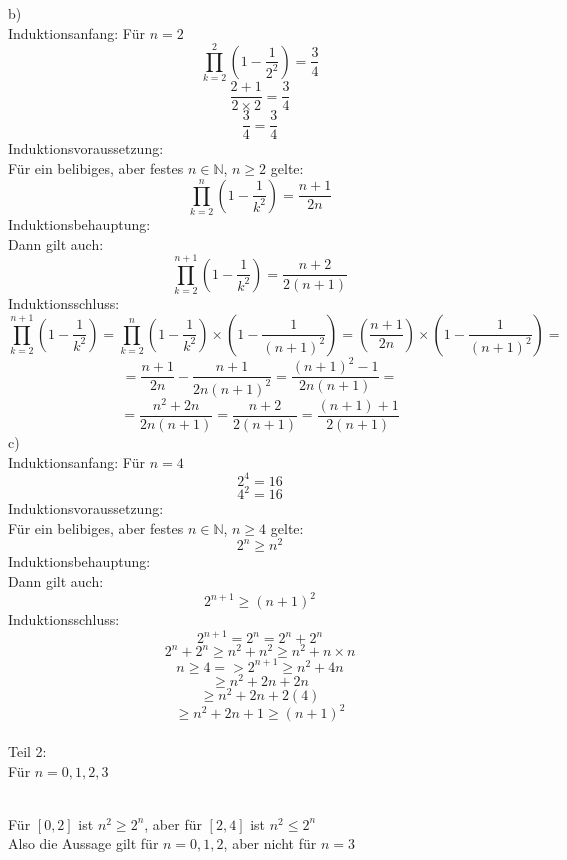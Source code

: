 \documentclass[11pt]{article}
\begin{document}
			\indent b)\\
				Induktionsanfang: Für $n=2$
					$$\prod\limits_{k=2}^2(1-\frac{1}{2^2})=\frac{3}{4}$$
					$$\frac{2+1}{2\times2}=\frac{3}{4}$$
					$$\frac{3}{4}=\frac{3}{4}$$
				Induktionsvoraussetzung:\\
				Für ein belibiges, aber festes $n \in \mathbb{N}$, $n \geq 2$ gelte:
					$$\prod\limits_{k=2}^n(1-\frac{1}{k^2})=\frac{n+1}{2n}$$
				Induktionsbehauptung:\\
				Dann gilt auch:
					$$\prod\limits_{k=2}^{n+1}(1-\frac{1}{k^2})=\frac{n+2}{2(n+1)}$$
				Induktionsschluss:
					$$\prod\limits_{k=2}^{n+1}(1-\frac{1}{k^2})=\prod\limits_{k=2}^n(1-\frac{1}{k^2})\times(1-\frac{1}{(n+1)^2})=\left(\frac{n+1}{2n}\right)\times\left(1-\frac{1}{(n+1)^2}\right)=$$
					$$=\frac{n+1}{2n}-\frac{n+1}{2n(n+1)^2}=\frac{(n+1)^2-1}{2n(n+1)}=$$
					$$=\frac{n^2+2n}{2n(n+1)}=\frac{n+2}{2(n+1)}=\frac{(n+1)+1}{2(n+1)}$$
			\indent c)\\
				Induktionsanfang: Für $n=4$
					$$2^4 = 16$$
					$$4^2 = 16$$
				Induktionsvoraussetzung:\\
				Für ein belibiges, aber festes $n \in \mathbb{N}$, $n \geq 4$ gelte:
					$$2^n \geq n^2$$
				Induktionsbehauptung:\\
				Dann gilt auch:
					$$2^{n+1}\geq (n+1)^2$$
				Induktionsschluss:
					$$2^{n+1}=2^n=2^n+2^n$$
					$$2^n+2^n \geq n^2+n^2 \geq n^2+n \times n$$
					$$n\geq4 => 2^{n+1} \geq n^2+4n$$
					$$\geq n^2 + 2n + 2n$$
					$$\geq n^2 + 2n + 2(4)$$
					$$\geq n^2 + 2n + 1 \geq (n+1)^2$$\\
				Teil 2:\\
				Für $n=0,1,2,3$	\\
				\\
			Für $[0,2]$ ist $n^2 \geq 2^n$, aber für $[2,4]$ ist $n^2 \leq 2^n$\\
			Also die Aussage gilt für $n=0,1,2$, aber nicht für $n=3$\\
\end{document}
